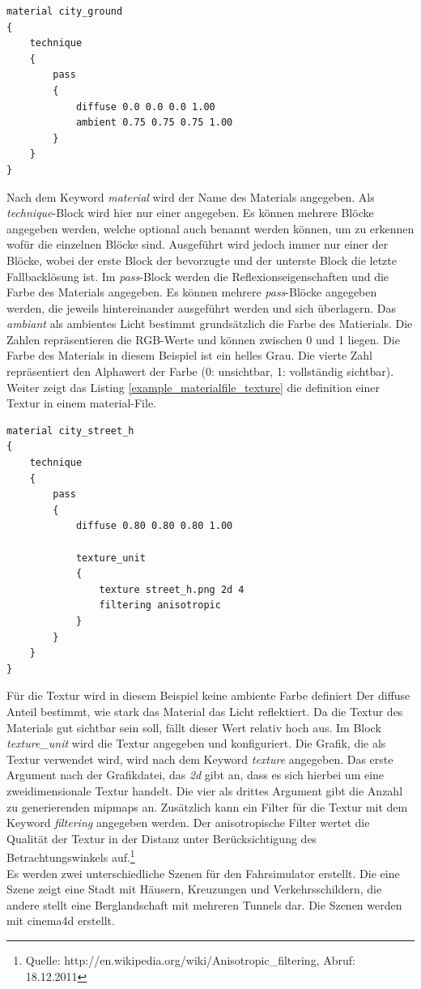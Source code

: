 \begin{lstlisting}[caption={Auszug aus dem material-File},label={example_materialfile_material}]
material city_ground
{
	technique
	{
		pass
		{
			diffuse 0.0 0.0 0.0 1.00
			ambient 0.75 0.75 0.75 1.00	
		}
	}
}
\end{lstlisting}
Nach dem Keyword \textit{material} wird der Name des Materials angegeben. Als \textit{technique}-Block wird hier nur einer angegeben. Es können mehrere Blöcke angegeben werden, welche optional auch benannt werden können, um zu erkennen wofür die einzelnen Blöcke sind. Ausgeführt wird jedoch immer nur einer der Blöcke, wobei der erste Block der bevorzugte und der unterste Block die letzte Fallbacklösung ist. Im \textit{pass}-Block werden die Reflexionseigenschaften und die Farbe des Materials angegeben. Es können mehrere \textit{pass}-Blöcke angegeben werden, die jeweils hintereinander ausgeführt werden und sich überlagern. Das \textit{ambiant} als ambientes Licht bestimmt grundsätzlich die Farbe des Matierials. Die Zahlen repräsentieren die RGB-Werte und können zwischen 0 und 1 liegen. Die Farbe des Materials in diesem Beispiel ist ein helles Grau. Die vierte Zahl repräsentiert den Alphawert der Farbe (0: unsichtbar, 1: vollständig sichtbar).
Weiter zeigt das Listing \ref{example_materialfile_texture} die definition einer Textur in einem material-File.\\
\newpage
\begin{lstlisting}[caption={Beispiel aus dem material-File zur Beschreibung einer Textur},label={example_materialfile_texture}]
material city_street_h
{
	technique
	{
		pass
		{
			diffuse 0.80 0.80 0.80 1.00

			texture_unit
			{
				texture street_h.png 2d 4
				filtering anisotropic
			}
		}
	}
}
\end{lstlisting}
Für die Textur wird in diesem Beispiel keine ambiente Farbe definiert Der diffuse Anteil bestimmt, wie stark das Material das Licht reflektiert. Da die Textur des Materials gut sichtbar sein soll, fällt dieser Wert relativ hoch aus. Im Block \textit{texture\_unit} wird die Textur angegeben und konfiguriert. Die Grafik, die als Textur verwendet wird, wird nach dem Keyword \textit{texture} angegeben. Das erste Argument nach der Grafikdatei, das \textit{2d} gibt an, dass es sich hierbei um eine zweidimensionale Textur handelt. Die vier als drittes Argument gibt die Anzahl zu generierenden \glspl{mipmap} an. Zusätzlich kann ein Filter für die Textur mit dem Keyword \textit{filtering} angegeben werden. Der anisotropische Filter wertet die Qualität der Textur in der Distanz unter Berücksichtigung des Betrachtungswinkels auf.\footnote{Quelle: http://en.wikipedia.org/wiki/Anisotropic\_filtering, Abruf: 18.12.2011}\\
Es werden zwei unterschiedliche Szenen für den Fahrsimulator erstellt. Die eine Szene zeigt eine Stadt mit Häusern, Kreuzungen und Verkehrsschildern, die andere stellt eine Berglandschaft mit mehreren Tunnels dar. Die Szenen werden mit \gls{cinema4d} erstellt. 
\newpage
